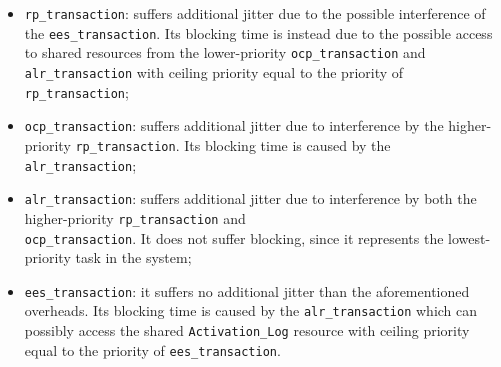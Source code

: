 \begin{itemize}
  \item \texttt{rp\_transaction}: suffers additional jitter due to the possible
  interference of the \texttt{ees\_transaction}. Its blocking time is instead due
  to the possible access to shared resources from the lower-priority
  \texttt{ocp\_transaction} and \texttt{alr\_transaction} with ceiling
  priority equal to the priority of \texttt{rp\_transaction};
  \item \texttt{ocp\_transaction}: suffers additional jitter due to interference
  by the higher-priority \texttt{rp\_transaction}. Its blocking time is caused
  by the \texttt{alr\_transaction};
  \item \texttt{alr\_transaction}: suffers additional jitter due to interference
  by both the higher-priority \texttt{rp\_transaction} and \\
  \texttt{ocp\_transaction}. It does not suffer blocking, since it represents
  the lowest-priority task in the system;
  \item \texttt{ees\_transaction}: it suffers no additional jitter than the
  aforementioned overheads. Its blocking time is caused by the
  \texttt{alr\_transaction} which can possibly access the shared
  \texttt{Activation\_Log} resource with ceiling priority equal to the
  priority of \texttt{ees\_transaction}.
\end{itemize}
\begin{table}[H]
  \caption{Holistic Analysis Results Rust}
  \label{tab:holistic-analysis-rust}
\end{table}
